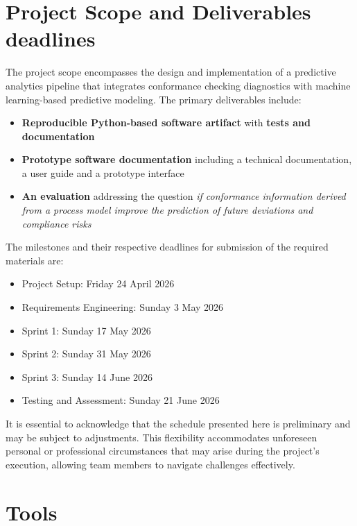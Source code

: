 \documentclass[12pt,a4paper]{article}
\begin{document}
\section{Project Scope and Deliverables deadlines}\label{sec:charter}
The project scope encompasses the design and implementation of a predictive analytics pipeline that integrates conformance checking diagnostics with machine learning-based predictive modeling. The primary deliverables include:
\begin{itemize}
	\item \textbf{Reproducible Python-based software artifact} with \textbf{tests and documentation}
	\item \textbf{Prototype software documentation} including a technical documentation, a user guide and a prototype interface
	\item \textbf{An evaluation} addressing the question \textit{if conformance information derived from a process model improve the prediction of future deviations and compliance risks}
\end{itemize}
	The milestones and their respective deadlines for submission of the required materials are:
\begin{itemize}
	\item Project Setup: Friday 24 April 2026
	\item Requirements Engineering: Sunday 3 May 2026
	\item Sprint 1: Sunday 17 May 2026
	\item Sprint 2: Sunday 31 May 2026
	\item Sprint 3: Sunday 14 June 2026
	\item Testing and Assessment: Sunday 21 June 2026 
\end{itemize}
It is essential to acknowledge that the schedule presented here is preliminary and may be subject to adjustments. This flexibility accommodates unforeseen personal or professional circumstances that may arise during the project's execution, allowing team members to navigate challenges effectively. 

\section{Tools}
\end{document}
